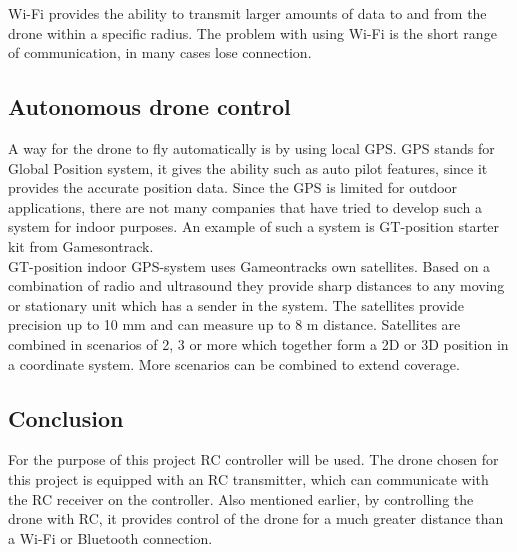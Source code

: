 Wi-Fi provides the ability to transmit larger amounts of data to and from the drone within a specific radius. The problem with using Wi-Fi is the short range of communication, in many cases lose connection. 

\subsection*{Autonomous drone control}
A way for the drone to fly automatically is by using local GPS. GPS stands for Global Position system, it gives the ability such as auto pilot features, since it provides the accurate position data.
Since the GPS is limited for outdoor applications, there are not many companies that have tried to develop such a system for indoor purposes. An example of such a system is GT-position starter kit from Gamesontrack. 
\newline \\
GT-position indoor GPS-system uses Gameontracks own satellites.
Based on a combination of radio and ultrasound they provide sharp distances to any moving or stationary unit which has a sender in the system.
The satellites provide precision up to 10 mm and can measure up to 8 m distance. Satellites are combined in scenarios of 2, 3 or more which together form a 2D or 3D position in a coordinate system. More scenarios can be combined to extend coverage.\cite{gt-position}

\subsection*{Conclusion} 
For the purpose of this project RC controller will be used. The drone chosen for this project is equipped with an RC transmitter, which can communicate with the RC receiver on the controller.\cite{Control} Also mentioned earlier, by controlling the drone with RC, it provides control of the drone for a much greater distance than a Wi-Fi or Bluetooth connection.











